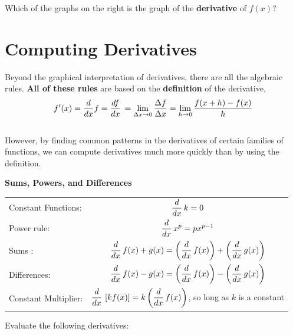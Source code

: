Which of the graphs on the right is the graph of the {\bf derivative} of
$f(x)$?
\newpage


\section*{Computing Derivatives}



Beyond the graphical interpretation of derivatives, there are all the
algebraic rules.  {\bf All of these rules} are based on the {\bf definition}
of the derivative, \\[2ex]
\begin{align*} 
f'(x) = \frac{d}{dx} f = \frac{df}{dx} \, = \lim_{\Delta x \to 0} \frac{\Delta f}{\Delta x} = \lim_{h \to 0} \frac{f(x+h) - f(x)}{h}
\end{align*}  \\[2ex]

However, by finding common patterns in the derivatives of certain
families of functions, we can compute derivatives much more quickly
than by using the definition.

\newpage

\begin{boxnote}
{\bf Sums, Powers, and Differences}

\LARGE
\begin{tabular}{lc}
Constant Functions: & $\displaystyle \frac{d}{dx} \, k = 0 $ \\[7ex]
Power rule: & $\displaystyle \frac{d}{dx} \, x^p = p x^{p-1}$ \\[7ex]
Sums : & $\displaystyle \frac{d}{dx} \, f(x) + g(x) = \left(\frac{d}{dx} \, f(x)\right) + \left(\frac{d}{dx} \, g(x) \right)$ \\[7ex]
Differences: & $\displaystyle \frac{d}{dx} \, f(x) - g(x) = \left(\frac{d}{dx} \, f(x)\right) - \left(\frac{d}{dx} \, g(x) \right)$ \\[7ex]
Constant Multiplier: & $\displaystyle \frac{d}{dx} \, \left[k f(x)\right] = k \left(\frac{d}{dx} \, f(x)\right)$, so long as $k$ is a constant
\end{tabular}
\setfont

\end{boxnote}

\newpage

\problem Evaluate the following derivatives: 

